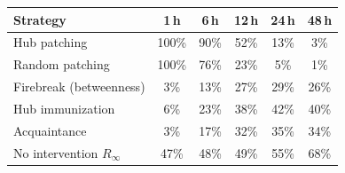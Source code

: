 \begin{tabular}{lccccc}
\toprule
Strategy & 1\,h & 6\,h & 12\,h & 24\,h & 48\,h \\
\midrule
Hub patching & 100\% & 90\% & 52\% & 13\% & 3\% \\
Random patching & 100\% & 76\% & 23\% & 5\% & 1\% \\
Firebreak (betweenness) & 3\% & 13\% & 27\% & 29\% & 26\% \\
Hub immunization & 6\% & 23\% & 38\% & 42\% & 40\% \\
Acquaintance & 3\% & 17\% & 32\% & 35\% & 34\% \\
\midrule
No intervention $R_\infty$ & 47\% & 48\% & 49\% & 55\% & 68\% \\
\bottomrule
\end{tabular}
